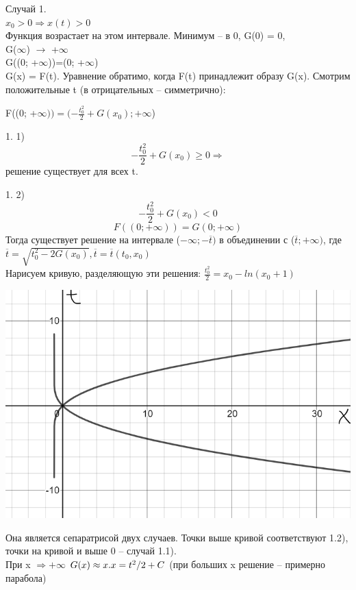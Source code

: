 \documentclass[10pt]{report}
\begin{document}
Случай 1.\\
$x_0>0 \Rightarrow x(t)>0$\\
Функция возрастает на этом интервале. Минимум -- в 0, G(0) = 0,\\
G($\infty$) $\rightarrow$ +$\infty$ \\
G((0; +$\infty$))=(0; +$\infty$)\\
G(x) =  F(t). Уравнение обратимо, когда F(t) принадлежит образу G(x).  Смотрим положительные t (в отрицательных -- симметрично):

F((0; +$\infty))=(-\frac {t_0^2} 2 +G(x_0); +\infty$)

1. 1) \[-\frac {t_0^2} 2 +G(x_0) \ge 0 \Rightarrow\] решение существует для всех t.

1. 2) \[-\frac {t_0^2} 2 +G(x_0) < 0
\]\[
F((0; +\infty))=G(0; +\infty)\]
Тогда существует решение на интервале  ($-\infty; -\overline{t})$  в объединении с  ($\overline{t}; +\infty)$, где\\
$\overline{t} = \sqrt{t_0^2-2G(x_0)}, \overline{t} = \overline{t}(t_0, x_0)$\\

Нарисуем кривую, разделяющую эти решения: $\frac {t_0^2} 2 = x_0 - ln(x_0+1)$
\begin{center}
{\includegraphics[scale=0.5]{graph2.3.png}} 
\end{center}
Она является сепаратрисой двух случаев. Точки выше кривой соответствуют 1.2), точки на кривой и выше 0 -- случай 1.1). \\
При x $\Rightarrow +\infty$  $G(x) \approx x.\\
 x = t^2/2 + C $ (при больших x решение -- примерно парабола) \\
\end{document}
